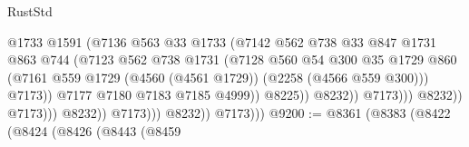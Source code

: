 \begin{lexlean}{RustStd}
\begin{coremodule}
                                                @1733
                                                @1591
                                                (@7136
                                                  @563
                                                  @33
                                                  @1733
                                                  (@7142
                                                    @562
                                                    @738
                                                    @33
                                                    @847
                                                    @1731
                                                    @863
                                                    @744
                                                    (@7123
                                                      @562
                                                      @738
                                                      @1731
                                                      (@7128
                                                        @560
                                                        @54
                                                        @300
                                                        @35
                                                        @1729
                                                        @860
                                                        (@7161
                                                          @559
                                                          @1729
                                                          (@4560 (@4561 @1729))
                                                          (@2258 (@4566 @559 @300)))
                                                        @7173))
                                                    @7177
                                                    @7180
                                                    @7183
                                                    @7185
                                                    @4999))
                                                @8225))
                                            @8232))
                                        @7173)))
                                  @8232))
                              @7173)))
                        @8232))
                    @7173)))
              @8232))
          @7173)))
@9200 := @8361
    (@8383
      (@8422
        (@8424
          (@8426
            (@8443
              (@8459

\end{coremodule}
\end{lexlean}
